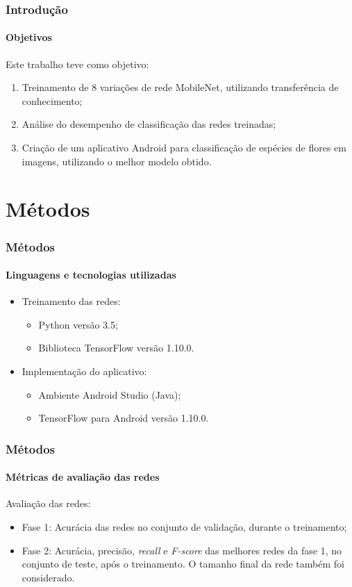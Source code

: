 \documentclass{beamer}
\begin{document}
    \begin{frame}
      \frametitle{Introdução}
      \framesubtitle{Objetivos}
      Este trabalho teve como objetivo:\medskip
      \begin{enumerate}        
        \item<1-> Treinamento de 8 variações de rede MobileNet, utilizando transferência de conhecimento;        
        \medskip 
        \item<2-> Análise do desempenho de classificação das redes treinadas;       
        \medskip        
        \item<3-> Criação de um aplicativo Android para classificação de espécies de flores em imagens, utilizando o melhor modelo obtido.
        \medskip
      \end{enumerate}
    \end{frame}
    
    \section{Métodos} %
    \begin{frame}
      \frametitle{Métodos}
      \framesubtitle{Linguagens e tecnologias utilizadas}      
	  \begin{itemize}
        \item<1-> Treinamento das redes: \medskip
	    		\begin{itemize}
	    			\item<1-> Python versão 3.5;\medskip
	    			\item<1-> Biblioteca TensorFlow versão 1.10.0.\medskip
	    		\end{itemize}  
      \end{itemize}	
      \begin{itemize}
        \item<2-> Implementação do aplicativo: \medskip
	    		\begin{itemize}
	    			\item<2-> Ambiente Android Studio (Java); \medskip
	    			\item<2-> TensorFlow para Android versão 1.10.0. \medskip	    			
	    		\end{itemize}  
      \end{itemize}			      
    \end{frame}
        
    \begin{frame}
      \frametitle{Métodos}
      \framesubtitle{Métricas de avaliação das redes}
      \bigskip Avaliação das redes: \medskip     
	 \begin{itemize}
		\item<1-> Fase 1: Acurácia das redes no conjunto de validação, durante o treinamento;		        
        \item<2-> Fase 2: Acurácia, precisão, \textit{recall} e \textit{F-score} \cite{sokolova} das 
        melhores redes da fase 1, no conjunto de teste, após o treinamento. O tamanho final da rede também foi considerado. \medskip
     \end{itemize}	       
       
    \end{frame}
        
\end{document}

